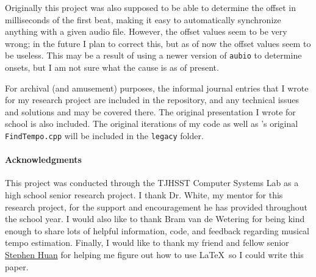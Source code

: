 \documentclass[11pt, oneside]{article}
\begin{document}
Originally this project was also supposed to be able to determine the offset in
milliseconds of the first beat, making it easy to automatically synchronize
anything with a given audio file. However, the offset values seem to be very
wrong; in the future I plan to correct this, but as of now the offset values
seem to be useless. This may be a result of using a newer version of
\texttt{aubio} to determine onsets, but I am not sure what the cause is as of
present.

For archival (and amusement) purposes, the informal journal entries that I wrote
for my research project are included in the repository, and any technical issues
and solutions and may be covered there. The original presentation I wrote for
school is also included. The original iterations of my code as well as
\citeauthor*{bram}'s original \texttt{FindTempo.cpp} will be included in the
\texttt{legacy} folder.


\paragraph{Acknowledgments}
This project was conducted through the TJHSST Computer Systems Lab as a high
school senior research project. I thank Dr. White, my mentor for this research
project, for the support and encouragement he has provided throughout the school
year. I would also like to thank Bram van de Wetering for being kind enough to
share lots of helpful information, code, and feedback regarding musical tempo
estimation. Finally, I would like to thank my friend and fellow senior
\href{https://github.com/stephen-huan}{Stephen Huan} for helping me figure out
how to use \LaTeX\ so I could write this paper.

\newpage

\printbibliography

\newpage
\end{document}
